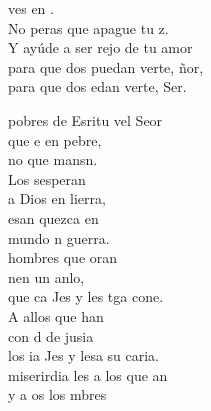 \documentclass[12pt]{article}
\begin{document}
\begin{multicols*}{2}
\begin{cancion}%
	 ves en . \\
	No peras que apague tu z.\\
	Y ayúde a ser rejo de tu amor\\
	para que dos puedan verte, ñor,\\
	para que dos edan verte, Ser.\\
\end{cancion}%

\end{multicols*}
\newpage
{}
\begin{multicols*}{2}
\begin{cancion}%
	 pobres de Esritu vel Seor \\
	que e en pebre, \\
	no que mansn.  \\
\jump
	Los sesperan\\
	a Dios en lierra,\\
	esan quezca en \\
	 mundo n guerra.\\
\jump
	 hombres que oran \\
	nen un anlo,\\
	que ca Jes y les tga cone. \\
\jump
	A allos que han \\
	con d de jusia\\
	los ia Jes y lesa su caria.\\
\jump
	miserirdia les a los que an\\
	y a os los mbres\\

\end{cancion}
\end{multicols*}
\end{document}
